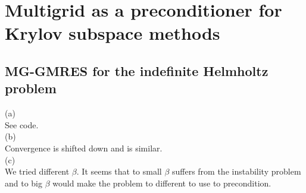 \documentclass[a4paper,12pt]{article}
\begin{document}
\section{Multigrid as a preconditioner for Krylov subspace methods}

\subsection{MG-GMRES for the indefinite Helmholtz problem}
(a) \\
See code.\\
(b) \\
Convergence is shifted down and is similar.\\
(c) \\
We tried different $\beta$. It seems that to small $\beta$ suffers from the instability problem and
to big $\beta$ would make the problem to different to use to precondition.
\end{document}
